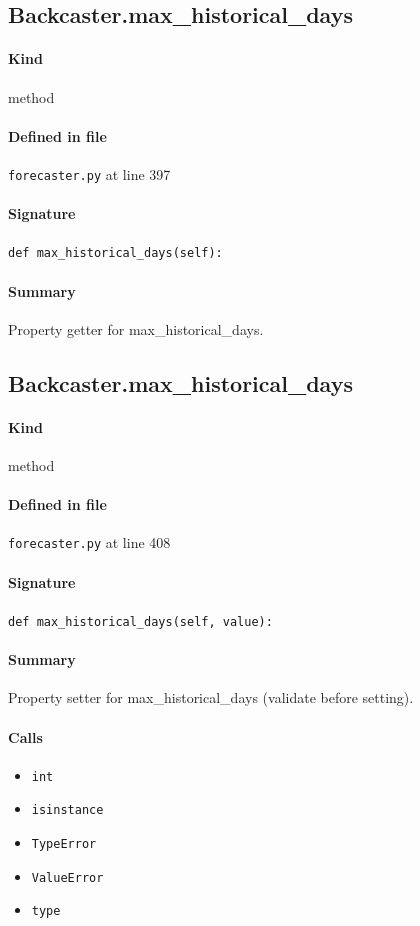 \documentclass[11pt]{report}
\begin{document}
\subsection{Backcaster.max\_historical\_days}
\label{def:forecaster.py:Backcaster.max_historical_days:L397}
\paragraph{Kind} method
\paragraph{Defined in file} \texttt{forecaster.py} at line 397
\paragraph{Signature} \texttt{def max\_historical\_days(self):}
\paragraph{Summary} Property getter for max\_historical\_days.
\subsection{Backcaster.max\_historical\_days}
\label{def:forecaster.py:Backcaster.max_historical_days:L408}
\paragraph{Kind} method
\paragraph{Defined in file} \texttt{forecaster.py} at line 408
\paragraph{Signature} \texttt{def max\_historical\_days(self, value):}
\paragraph{Summary} Property setter for max\_historical\_days (validate before setting).
\paragraph{Calls}
\begin{itemize}[leftmargin=*]
  \item \texttt{int}
  \item \texttt{isinstance}
  \item \texttt{TypeError}
  \item \texttt{ValueError}
  \item \texttt{type}
\end{itemize}
\end{document}

